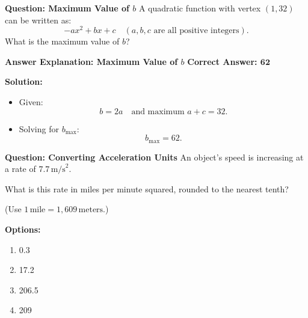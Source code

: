 \documentclass{beamer}
\begin{document}
\begin{frame}{\textbf{Question: Maximum Value of \( b \)}}
    A quadratic function with vertex \( (1, 32) \) can be written as:
    \[
    -ax^2 + bx + c \quad (a, b, c \text{ are all positive integers}).
    \]
    What is the maximum value of \( b \)?
\end{frame}

\begin{frame}{\textbf{Answer Explanation: Maximum Value of \( b \)}}
    \textbf{Correct Answer: \textcolor{novelPurple}{\( \mathbf{62} \)}}  

    \vspace{0.3cm}
    \textbf{Solution:}
    \begin{itemize}
        \item Given:
        \[
        b = 2a \quad \text{and maximum } a + c = 32.
        \]
        \item Solving for \( b_{\text{max}} \):
        \[
        b_{\text{max}} = \boxed{62}.
        \]
    \end{itemize}
\end{frame}

\begin{frame}{\textbf{Question: Converting Acceleration Units}}
    An object's speed is increasing at a rate of \( 7.7 \, \text{m/s}^2 \).  

    \vspace{0.3cm}
    What is this rate in miles per minute squared, rounded to the nearest tenth?  

    (Use \( 1 \, \text{mile} = 1,609 \, \text{meters} \).)

    \vspace{0.5cm}
    \textbf{Options:}
    \begin{enumerate}
        \item[A] 0.3
        \item[B] 17.2
        \item[C] 206.5
        \item[D] 209
    \end{enumerate}
\end{frame}
\end{document}
